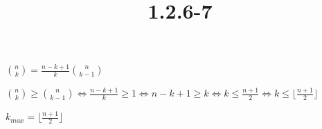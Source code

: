 \documentclass{article}
\title{1.2.6-7}
\begin{document}
\maketitle

$\binom{n}{k} = \frac{n-k+1}{k} \binom{n}{k-1}$

$\binom{n}{k} \geq \binom{n}{k-1} \iff \frac{n-k+1}{k} \geq 1 \iff n - k + 1 \geq k \iff k \leq \frac{n+1}{2} \iff k \leq \lfloor\frac{n+1}{2}\rfloor$

$k_{max} = \lfloor\frac{n+1}{2}\rfloor$
\end{document}
